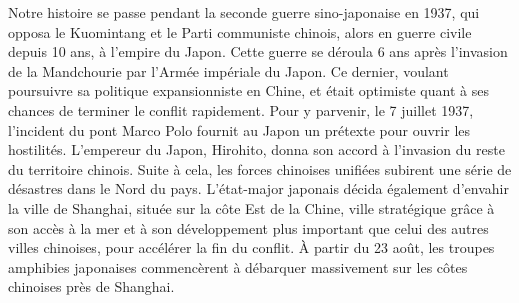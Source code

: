 

\newcommand{\maxa}{123456789}

Notre histoire se passe pendant la seconde guerre sino-japonaise en 1937, qui opposa le Kuomintang et le Parti communiste chinois, alors en guerre civile depuis 10 ans, à l’empire du Japon. Cette guerre se déroula 6 ans après l’invasion de la Mandchourie par l’Armée impériale du Japon. Ce dernier, voulant poursuivre sa politique expansionniste en Chine, et était optimiste quant à ses chances de terminer le conflit rapidement. Pour y parvenir, le 7 juillet 1937, l’incident du pont Marco Polo fournit au Japon un prétexte pour ouvrir les hostilités. L’empereur du Japon, Hirohito, donna son accord à l’invasion du reste du territoire chinois. Suite à cela, les forces chinoises unifiées subirent une série de désastres dans le Nord du pays. L’état-major japonais décida également d’envahir la ville de Shanghai, située sur la côte Est de la Chine, ville stratégique grâce à son accès à la mer et à son développement plus important que celui des autres villes chinoises, pour accélérer la fin du conflit. À partir du 23 août, les troupes amphibies japonaises commencèrent à débarquer massivement sur les côtes chinoises près de Shanghai.


